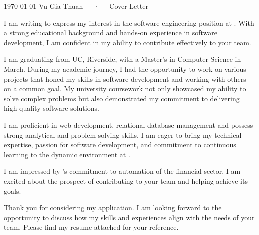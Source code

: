 \documentclass[11pt, a4paper]{derwent-cv}
\begin{document}
\makedercvheader[C]

\makecvfooter
  {\today}
  {Vu Gia Thuan~~~·~~~Cover Letter}
  {}

\makelettertitle

\begin{cvletter}
I am writing to express my interest in the software engineering position at \@companyname. With a strong educational background and hands-on experience in software development, I am confident in my ability to contribute effectively to your team.

I am graduating from UC, Riverside, with a Master's in Computer Science in March. During my academic journey, I had the opportunity to work on various projects that honed my skills in software development and working with others on a common goal. My university coursework not only showcased my ability to solve complex problems but also demonstrated my commitment to delivering high-quality software solutions.

I am proficient in web development, relational database management and possess strong analytical and problem-solving skills. I am eager to bring my technical expertise, passion for software development, and commitment to continuous learning to the dynamic environment at \@companyname.

I am impressed by \@companyname's commitment to automation of the financial sector. I am excited about the prospect of contributing to your team and helping \@companyname achieve its goals.

Thank you for considering my application. I am looking forward to the opportunity to discuss how my skills and experiences align with the needs of your team. Please find my resume attached for your reference.

\end{cvletter}
\makederletterclosing
\end{document}
